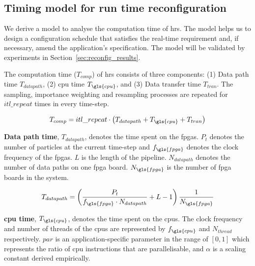 \subsection{Timing model for run time reconfiguration}
\label{sec:reconfig_reconfig}

We derive a model to analyse the computation time of \gls{hrs}.
The model helps us to design a configuration schedule that satisfies the real-time requirement and, if necessary, amend the application's specification.
The model will be validated by experiments in Section~\ref{sec:reconfig_results}.

The computation time ($T_{comp}$) of \gls{hrs} consists of three components: (1) Data path time $T_{datapath}$, (2) \gls{cpu} time $T_{\gls{cpu}}$, and (3) Data transfer time $T_{tran}$.
The sampling, importance weighting and resampling processes are repeated for $itl\_repeat$ times in every time-step.

\begin{equation}
\begin{aligned}
T_{comp} = itl\_repeat \cdot \left ( T_{datapath} + T_{\gls{cpu}} + T_{tran} \right )
\end{aligned}
\label{eqt:total}
\end{equation}

\textbf{Data path time}, $T_{datapath}$, denotes the time spent on the \gls{fpga}s.
$P_t$ denotes the number of particles at the current time-step and $f_{\gls{fpga}}$ denotes the clock frequency of the \gls{fpga}s.
$L$ is the length of the pipeline.
$N_{datapath}$ denotes the number of data paths on one \gls{fpga} board.
$N_{\gls{fpga}}$ is the number of \gls{fpga} boards in the system.

\begin{equation}
\begin{aligned}
T_{datapath} = \left(\frac{P_t}{f_{\gls{fpga}} \cdot N_{datapath}} + L - 1 \right) \frac{1}{N_{\gls{fpga}}}
\end{aligned}
\label{eqt:kernel}
\end{equation}

\textbf{\gls{cpu} time}, $T_{\gls{cpu}}$, denotes the time spent on the \gls{cpu}s.
The clock frequency and number of threads of the \gls{cpu}s are represented by $f_{\gls{cpu}}$ and $N_{thread}$ respectively.
$par$ is an application-specific parameter in the range of $[0,1]$ which represents the ratio of \gls{cpu} instructions that are parallelisable, and $\alpha$ is a scaling constant derived empirically.


